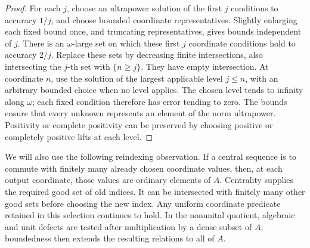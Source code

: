 \begin{proof}
For each \(j\), choose an ultrapower solution of the first \(j\)
conditions to accuracy \(1/j\), and choose bounded coordinate
representatives. Slightly enlarging each fixed bound once, and
truncating representatives, gives bounds independent of \(j\).
There is an \(\omega\)-large set on which these first \(j\)
coordinate conditions hold to accuracy \(2/j\). Replace these sets
by decreasing finite intersections, also intersecting the \(j\)-th
set with \(\{n\ge j\}\). They have empty intersection. At coordinate
\(n\), use the solution of the largest applicable level \(j\le n\),
with an arbitrary bounded choice when no level applies.
The chosen level tends to infinity along \(\omega\); each fixed
condition therefore has error tending to zero. The bounds ensure
that every unknown represents an element of the norm ultrapower.
Positivity or complete positivity can be preserved by choosing
positive or completely positive lifts at each level.
\end{proof}

We will also use the following reindexing observation. If a central
sequence is to commute with finitely many already chosen coordinate
values, then, at each output coordinate, those values are ordinary
elements of \(A\). Centrality supplies the required good set of old
indices. It can be intersected with finitely many other good sets
before choosing the new index. Any uniform coordinate predicate
retained in this selection continues to hold. In the nonunital
quotient, algebraic and unit defects are tested after multiplication
by a dense subset of \(A\); boundedness then extends the resulting
relations to all of \(A\).

